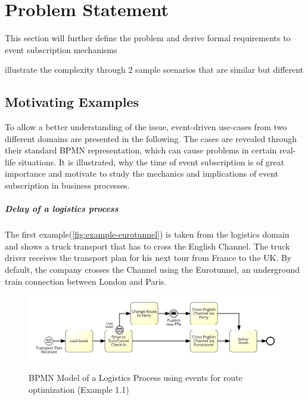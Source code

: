 \chapter{Problem Statement}\label{ch:problemstatement}

This section will further define the problem and derive formal requirements to event subscription mechanisms

illustrate the complexity through 2 sample scenarios that are similar but different

\section{Motivating Examples}

To allow a better understanding of the issue, event-driven use-cases from two different domains are presented in the following.
The cases are revealed through their standard BPMN representation, which can cause problems in certain real-life situations.
It is illustrated, why the time of event subscription is of great importance and motivate to study the mechanics and implications of event subscription in business processes.

\paragraph{Delay of a logistics process}
The first example(\autoref{fig:example-eurotunnel}) is taken from the logistics domain and shows a truck transport that has to cross the English Channel.
The truck driver receives the transport plan for his next tour from France to the UK. By default, the company crosses the Channel using the Eurotunnel, an underground train connection between London and Paris.

\begin{figure}[]
	\myfloatalign
	{\includegraphics[width=1\linewidth]{chapters/requirements/Eurotunnel-simplified.png}}
	\caption{BPMN Model of a Logistics Process using events for route optimization (Example 1.1)}
	\label{fig:example-eurotunnel}
\end{figure}

